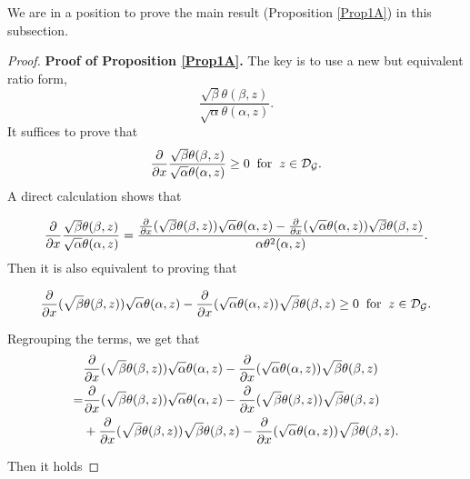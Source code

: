 \documentclass[reqno,english]{amsart}
\newtheorem{open problem}{Open Problem}[section]
\newtheorem{open question}{Open Question}[section]
\newtheorem{open questions on hexagonal lattice}{Open Questions on hexagonal lattice}[section]
\begin{document}
 We are in a position to prove the main result (Proposition \ref{Prop1A}) in this subsection.
\begin{proof}{\bf Proof of Proposition \ref{Prop1A}.}
The key is to use a new but equivalent ratio form,
$$\frac{\sqrt\beta\theta(\beta,z)}{\sqrt\alpha\theta(\alpha,z)}.$$
It suffices to prove that
\begin{equation}\aligned\nonumber
\frac{\partial}{\partial x}\frac{\sqrt\beta\theta(\beta,z)}{\sqrt\alpha\theta(\alpha,z)}\geq0\;\;\hbox{for}\;\;z\in\mathcal{D}_{\mathcal{G}}.
\endaligned\end{equation}
A direct calculation shows that

\begin{equation}\aligned\nonumber
\frac{\partial}{\partial x}\frac{\sqrt\beta\theta(\beta,z)}{\sqrt\alpha\theta(\alpha,z)}=
\frac{\frac{\partial}{\partial x}(\sqrt\beta\theta(\beta,z))\sqrt\alpha\theta(\alpha,z)
-\frac{\partial}{\partial x}(\sqrt\alpha\theta(\alpha,z))\sqrt\beta\theta(\beta,z)
}
{\alpha \theta^2(\alpha,z)}.
\endaligned\end{equation}
Then it is also equivalent to proving that

\begin{equation}\aligned\label{K0}
\frac{\partial}{\partial x}(\sqrt\beta\theta(\beta,z))\sqrt\alpha\theta(\alpha,z)
-\frac{\partial}{\partial x}(\sqrt\alpha\theta(\alpha,z))\sqrt\beta\theta(\beta,z)\geq0\;\;\hbox{for}\;\;z\in\mathcal{D}_{\mathcal{G}}.
\endaligned\end{equation}

Regrouping the terms, we get that
\begin{equation}\aligned\nonumber
&\frac{\partial}{\partial x}(\sqrt\beta\theta(\beta,z))\sqrt\alpha\theta(\alpha,z)
-\frac{\partial}{\partial x}(\sqrt\alpha\theta(\alpha,z))\sqrt\beta\theta(\beta,z)\\
=&\frac{\partial}{\partial x}(\sqrt\beta\theta(\beta,z))\sqrt\alpha\theta(\alpha,z)
-\frac{\partial}{\partial x}(\sqrt\beta\theta(\beta,z))\sqrt\beta\theta(\beta,z)\\
&+\frac{\partial}{\partial x}(\sqrt\beta\theta(\beta,z))\sqrt\beta\theta(\beta,z)
-\frac{\partial}{\partial x}(\sqrt\alpha\theta(\alpha,z))\sqrt\beta\theta(\beta,z).
\endaligned\end{equation}

Then it  holds


\end{proof}
\end{document}
